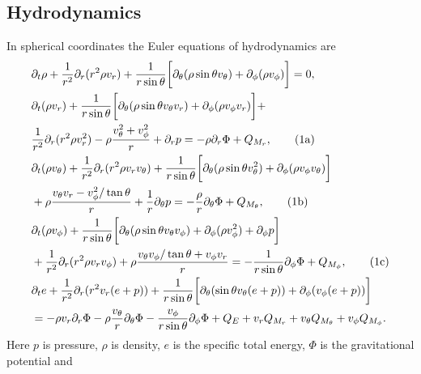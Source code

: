 \subsection{Hydrodynamics}
In spherical coordinates the Euler equations of hydrodynamics are 
\begin{alignat}{1}
&\partial_t \rho + \frac{1}{r^2} \partial_r (r^2 \rho v_r) + \frac{1}{r \sin{\theta}} \bigg[ \partial_{\theta} (\rho \sin{\theta} v_{\theta}) + \partial_{\phi} (\rho v_{\phi}) \bigg] = 0, \label{eqN:cont} \\
\stepcounter{equation}
&\partial_t (\rho v_r) + \frac{1}{r \sin{\theta}} \bigg[ \partial_{\theta} (\rho \sin{\theta} v_{\theta} v_r)
+\partial_{\phi} (\rho v_{\phi} v_r) \bigg]  + \nonumber \\ 
&\frac{1}{r^2} \partial_r (r^2 \rho v_r^2)  - \rho \frac{v_{\theta}^2 + v_{\phi}^2}{r} + \partial_r p 
= - \rho \partial_r \Phi + Q_{M_r}, \tag{\theequation{}a} \\
%
&\partial_t (\rho v_{\theta}) + \frac{1}{r^2} \partial_r (r^2 \rho v_r v_{\theta}) + \frac{1}{r \sin{\theta}}\bigg[ \partial_{\theta} (\rho \sin{\theta} v_{\theta}^2) +
\partial_{\phi} (\rho v_{\phi} v_{\theta}) \bigg] \nonumber \\
&+\rho \frac{v_{\theta}v_r - v_{\phi}^2/\tan{\theta}}{r} + \frac{1}{r}\partial_{\theta} p = - \frac{\rho}{r} \partial_{\theta} \Phi + Q_{M_{\theta}}, \tag{\theequation{}b} \\
%
&\partial_t (\rho v_{\phi})  
+\frac{1}{r \sin{\theta}} \bigg[ \partial_{\theta} (\rho \sin{\theta} v_{\theta} v_{\phi}) +
\partial_{\phi} (\rho v_{\phi}^2)  + \partial_{\phi} p  \bigg] \nonumber \\
&+ \frac{1}{r^2} \partial_r (r^2 \rho v_r v_{\phi}) +
\rho \frac{v_{\theta}v_{\phi}/\tan{\theta} + v_{\phi}v_r}{r}
 = -\frac{1}{r \sin{\theta}} \partial_{\phi} \Phi + Q_{M_{\phi}}, \tag{\theequation{}c} \\
%
\stepcounter{equation}
&\partial_t e + \frac{1}{r^2} \partial_r (r^2 v_r (e + p))
+\frac{1}{r \sin{\theta}} \bigg[ \partial_{\theta} ( \sin{\theta} v_{\theta} (e + p))  +
\partial_{\phi} (v_{\phi} (e + p)) \bigg] \nonumber \\
&= -\rho v_r \partial_r \Phi - \rho\frac{v_{\theta}}{r}\partial_{\theta}\Phi - \frac{v_{\phi}}{r \sin{\theta}} \partial_{\phi} \Phi
 + Q_E + v_r Q_{M_r} + v_{\theta} Q_{M_{\theta}} + v_{\phi} Q_{M_{\phi}}.
\end{alignat}
Here $p$ is pressure, $\rho$ is density, $e$ is the specific total energy,  $\Phi$ is the gravitational potential and
